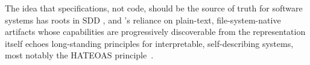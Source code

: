 The idea that specifications, not code, should be the source of truth for software systems has roots in SDD \cite{piskala2025sdd,meng2025wysiwid,bockeler2025sddtools,gu2025challenges}, and \sysname's reliance on plain-text, file-system-native artifacts whose capabilities are progressively discoverable from the representation itself echoes long-standing principles for interpretable, self-describing systems, most notably the HATEOAS principle~\cite{fielding2017rest}.
